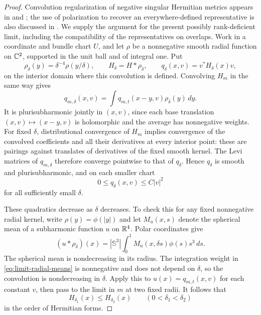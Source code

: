 \begin{proof}
Convolution regularization of
negative singular Hermitian metrics appears in
\cite[Section~3, Proposition~3.1]{BerndtssonPaun2008} and
\cite[Proposition~1.3(i)]{Raufi2015}; the use of polarization to recover
an everywhere-defined representative is also discussed in
\cite[Remark~2.2.3]{PaunTakayama2018}.
We supply the argument for the present possibly rank-deficient limit,
including the compatibility of the representatives on overlaps.
Work in a coordinate and bundle
chart $U$, and let $\rho$ be a nonnegative smooth radial function on
$\mathbb C^2$, supported in the unit ball and of integral one.  Put
\[
\rho_\delta(y)=\delta^{-4}\rho(y/\delta),\qquad
H_\delta=H*\rho_\delta,\qquad
q_\delta(x,v)=v^*H_\delta(x)v,
\]
on the interior domain where this convolution is defined.
Convolving $H_m$ in the same way gives
\[
q_{m,\delta}(x,v)
=\int q_{m,t}(x-y,v)\rho_\delta(y)\,dy.
\]
It is plurisubharmonic jointly in $(x,v)$, since each base translation
$(x,v)\mapsto(x-y,v)$ is holomorphic and the average has nonnegative
weights.  For fixed $\delta$, distributional convergence of $H_m$
implies convergence of the convolved coefficients and all their
derivatives at every interior point: these are pairings against
translates of derivatives of the fixed smooth kernel.  The Levi
matrices of $q_{m,\delta}$ therefore converge pointwise to that of
$q_\delta$.  Hence $q_\delta$ is smooth and plurisubharmonic, and on
each smaller chart
\begin{equation}\label{eq:limit-convolution-bound}
0\le q_\delta(x,v)\le C|v|^2
\end{equation}
for all sufficiently small $\delta$.

These quadratics decrease as $\delta$ decreases.  To check this for
any fixed nonnegative radial kernel, write $\rho(y)=\phi(|y|)$ and
let $M_u(x,s)$ denote the spherical mean of a subharmonic function
$u$ on $\mathbb R^4$.  Polar coordinates give
\begin{equation}\label{eq:limit-radial-means}
(u*\rho_\delta)(x)
=|\mathbb S^3|\int_0^1
M_u(x,\delta s)\phi(s)s^3\,ds.
\end{equation}
The spherical mean is nondecreasing in its radius.  The integration
weight in \eqref{eq:limit-radial-means} is nonnegative and does not
depend on $\delta$, so the convolution is nondecreasing in $\delta$.
Apply this to $u(x)=q_{m,t}(x,v)$ for each constant $v$, then pass to
the limit in $m$ at two fixed radii.  It follows that
\[
H_{\delta_1}(x)\le H_{\delta_2}(x)
\qquad(0<\delta_1<\delta_2)
\]
in the order of Hermitian forms.


\end{proof}
